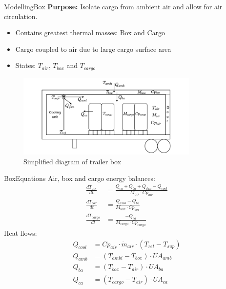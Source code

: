 
\begin{frame}{Modelling}{Box}
	\textbf{Purpose:} Isolate cargo from ambient air and allow for air circulation.
	\begin{itemize}
		\item Contains greatest thermal masses: Box and Cargo
		\item Cargo coupled to air due to large cargo surface area
		\item States: $T_{air}$, $T_{box}$ and $T_{cargo}$
	\end{itemize}
	\begin{figure}[h!]
		\centering
		\includegraphics[width=0.8\textwidth]{../Graphics/Box.pdf}
		\caption{Simplified diagram of trailer box}
		\label{fig:box_diagram}
	\end{figure}


\end{frame}

\begin{frame}{Box}{Equations}
	Air, box and cargo energy balances:
	\begin{align}
		\frac{dT_{air}}{dt} &= \frac{Q_{ca} + Q_{ba} + Q_{fan} -Q_{cool}}{M_{air} \cdot Cp_{air}} \label{eq:box_dT_air} \\
		\frac{dT_{box}}{dt} &= \frac{Q_{amb} - Q_{ba}}{M_{box} \cdot Cp_{box}} \label{eq:box_dT_box} \\
		\frac{dT_{cargo}}{dt} &= \frac{-Q_{ca}}{M_{cargo} \cdot Cp_{cargo}} \label{eq:box_dT_cargo}
	\end{align}
	Heat flows:
	\begin{align}
		Q_{cool}   & = Cp_{air} \cdot \dot{m}_{air} \cdot (T_{ret} - T_{sup})	\label{eq:box_Qcool} \\
		Q_{amb}    & = (T_{ambi} - T_{box}) \cdot U A_{amb}						\label{eq:box_Qab}   \\
		Q_{ba}     & = (T_{box} - T_{air}) \cdot U A_{ba}						\label{eq:box_Qba}   \\
		Q_{ca}     & = (T_{cargo} - T_{air}) \cdot U A_{ca}                  	\label{eq:box_Qca}
	\end{align}
\end{frame}



